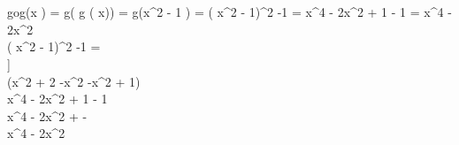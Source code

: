  \\

 \\

gog\left(x \right) = g\left( g \left( x\right)\right) = g\left(x^{2} - 1 \right) = \left( x^{2} - 1\right)^{2} -1 = x^{4} - 2x^{2} + 1 - 1 = x^{4} - 2x^{2} \\

 \Rightarrow  \left( x^{2} - 1\right)^{2} -1 =  \\

] \\

\left(x^{2 + 2} -x^{2} -x^{2} + 1\right)\\

x^{4} - 2x^{2} + 1 - 1\\

x^{4} - 2x^{2} +  - \\

x^{4} - 2x^{2}\\
